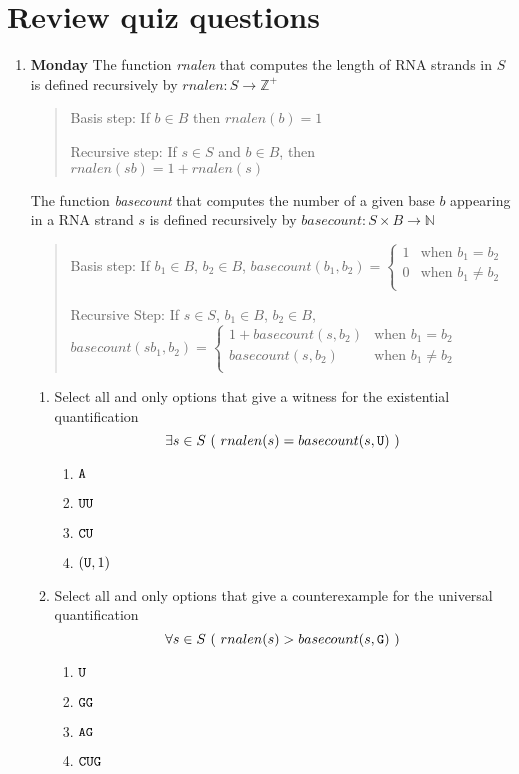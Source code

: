 \documentclass[12pt, oneside]{article}
\begin{document}
\section*{Review quiz questions}
\begin{enumerate}
\item {\bf Monday} The function \textit{rnalen} that computes the length of RNA strands in $S$ is defined recursively by
$rnalen: S  \to \mathbb{Z}^+$


\begin{quote}
Basis step: If $b \in B$ then $rnalen(b)  = 1$

Recursive step: If $s \in S$ and $b \in B$, then $rnalen(sb)  = 1 + rnalen(s)$
\end{quote}


The function \textit{basecount} that computes the number of a given base $b$ appearing in a RNA strand $s$ is defined recursively by $basecount : S \times B \to\mathbb{N}$

\begin{quote}
Basis step: If  $b_1 \in B$, $b_2 \in B$, $basecount(b_1, b_2) =
        \begin{cases}
            1 & \textrm{when } b_1 = b_2 \\
            0 & \textrm{when } b_1 \neq b_2 \\
        \end{cases}$

Recursive Step: If $s \in S$, $b_1 \in B$, $b_2 \in B$, $basecount(s b_1, b_2) =
        \begin{cases}
            1 + \textit{basecount}(s, b_2) & \textrm{when } b_1 = b_2 \\
            \textit{basecount}(s, b_2) & \textrm{when } b_1 \neq b_2 \\
        \end{cases}$
\end{quote}

\begin{enumerate}
\item Select all and only options that give a witness for the existential quantification
$$\exists s \in S ~(~rnalen(s) = basecount(s,\texttt{U})~)$$
\begin{enumerate}
\item $\texttt{A}$
\item $\texttt{U}\texttt{U}$
\item $\texttt{C}\texttt{U}$
\item $(\texttt{U}, 1)$
\end{enumerate}

\item Select all and only options that give a counterexample for the universal quantification
$$\forall s \in S ~(~rnalen(s) > basecount(s,\texttt{G})~)$$
\begin{enumerate}
\item $\texttt{U}$
\item $\texttt{G}\texttt{G}$
\item $\texttt{A}\texttt{G}$
\item $\texttt{C}\texttt{U}\texttt{G}$
\end{enumerate}


\end{enumerate}
\end{enumerate}
\end{document}
